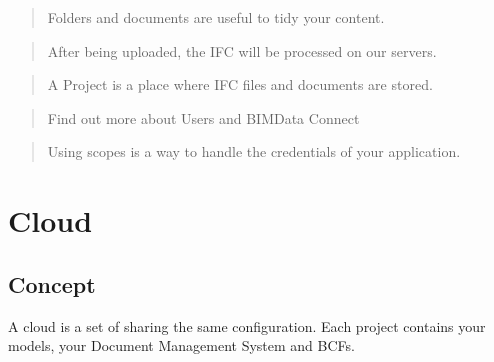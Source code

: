 \documentclass[a4paper,12pt,english]{sphinxmanual}
\begin{document}
\begin{sphinxShadowBox}
\begin{quote}

Folders and documents are useful to tidy your content.
\end{quote}
\end{sphinxShadowBox}

\begin{sphinxShadowBox}
\begin{quote}

After being uploaded, the IFC will be processed on our servers.
\end{quote}
\end{sphinxShadowBox}

\begin{sphinxShadowBox}
\begin{quote}

A Project is a place where IFC files and documents are stored.
\end{quote}
\end{sphinxShadowBox}

\begin{sphinxShadowBox}
\begin{quote}

Find out more about Users and BIMData Connect
\end{quote}
\end{sphinxShadowBox}

\begin{sphinxShadowBox}
\begin{quote}

Using scopes is a way to handle the credentials of your application.
\end{quote}
\end{sphinxShadowBox}


\section{Cloud}
\label{\detokenize{concepts/cloud:cloud}}\label{\detokenize{concepts/cloud::doc}}

\subsection{Concept}
\label{\detokenize{concepts/cloud:concept}}
A cloud is a set of {\hyperref[\detokenize{concepts/projects::doc}]{}} sharing the same configuration.
Each project contains your models, your Document Management System and BCFs.
\end{document}
